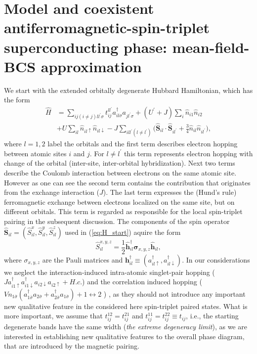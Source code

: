 \documentclass[aps,prb,showpacs,reprint]{revtex4-1}
\begin{document}
\section{Model and coexistent antiferromagnetic-spin-triplet
superconducting phase: mean-field-BCS approximation}\label{sec:model}
We start with the extended orbitally degenerate Hubbard Hamiltonian, which has the form
\begin{equation}
\begin{split}
\hat{H}&=\sum_{ij(i\neq j)ll^{\prime}\sigma}t^{ll^{\prime}}_{ij}
a_{il\sigma}^{\dag}a_{jl^{\prime}\sigma}+(U^{\prime}+J)\sum_{i}\hat{n}_{i1}\hat{n}_{i2}\\
&+U\sum_{il}\hat{n}_{il\uparrow}\hat{n}_{
il\downarrow}-J\sum_{ill^{\prime}(l\neq
l^{\prime})}\bigg(\mathbf{\hat{S}}_{il}\cdotp
\mathbf{\hat{S}}_{il^{\prime}}+\frac{3}{4}\hat{n}_{il}\hat{n}_{il^{\prime}}
\bigg),
\label{eq:H_start}
\end{split}
\end{equation}
where $l=1,2$ label the orbitals and the first term describes electron hopping
between atomic sites $i$ and $j$. For $l\neq l^{\prime}$ this term
represents electron hopping with change of the orbital (inter-site,
inter-orbital hybridization). Next two terms describe the Coulomb
interaction
between electrons on the same atomic site. However as one can see the second term contains the contribution that originates from the exchange interaction ($J$). The last term expresses the (Hund's
rule) ferromagnetic exchange between electrons localized on the same site, but
on different orbitals. This term is regarded as responsible for the local spin-triplet pairing in
the subsequent discussion. The components of the spin operator
$\mathbf{\hat{S}}_{il}=( \hat{S}^x_{il}, \hat{S}^y_{il}, \hat{S}^z_{il} )$ used
in (\ref{eq:H_start}) aquire the form
\begin{equation}
 \hat{S}^{x,y,z}_{il}=\frac{1}{2}\mathbf{\hat{h}}_{il}^{\dagger}\mathbf{
\sigma} _ {x,y,z}\mathbf{\hat{h}}_{il},
\end{equation}
where $\sigma_{x,y,z}$ are the Pauli matrices and
$\mathbf{h}_{il}^{\dagger}\equiv (a^{\dagger}_{il\uparrow},
a^{\dagger}_{il\downarrow})$. In our considerations we neglect the
interaction-induced intra-atomic singlet-pair hopping
($Ja^{\dag}_{i1\uparrow}a^{\dag}_{i1\downarrow}a_{i2\downarrow}a_{i2\uparrow}
+H.c.$) and the
correlation induced hopping ($Vn_{1\bar{\sigma}}(a^{\dagger}_{1\bar{\sigma}}a_{2\bar{\sigma}}+a^{\dagger}_{2\bar{\sigma}}a_{1\bar{\sigma}})+1\leftrightarrow2$ ) \cite{Nomura2002}, as they should not introduce any
important new qualitative feature in the
considered here spin-triplet paired states. What is more important, we assume that
$t^{12}_{ij}=t^{21}_{ij}$ and $t^{11}_{ij}=t^{22}_{ij}\equiv t_{ij}$, i.e., the
starting degenerate bands have the same width (\textit{the extreme degeneracy
limit}), as we are interested in establishing new qualitative features to the
overall phase diagram, that are introduced by the magnetic pairing. 
\end{document}
